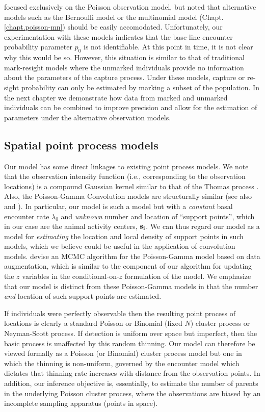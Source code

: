 \citet{chandler_royle:2012} focused exclusively on the Poisson
observation model, but noted that alternative models such as the
Bernoulli model or the multinomial model (Chapt. \ref{chapt.poisson-mn}) should
be easily accomodated. Unfortunately, our experimentation with these models
indicates that the base-line encounter probability parameter $p_0$ is
not identifiable. At this point in time, it is not clear why this
would be so. However, this situation is similar to that of traditional
mark-resight models where the unmarked individuals provide no
information about the parameters of the capture process. Under these
models, capture or re-sight probability can only be estimated by
marking a subset of the population. In the next chapter we demonstrate
how data from marked and unmarked individuals can be combined to
improve precision and allow for the estimation of parameters under the
alternative observation models.



\subsection{Spatial point process models}


Our model has some direct linkages to existing point process
models. We note that the observation intensity function (i.e.,
corresponding to the observation
locations) is a compound Gaussian kernel similar to
that of the Thomas process
\citep[pp. 61-62]{thomas:1949, moller_waagepetersen:2004}.
Also, the Poisson-Gamma Convolution models
\citep{wolpert_ickstadt:1998} are structurally similar (see also \cite{higdon:1998}
and \cite{best_etal:2000}).
 In particular, our model is such a model but
with a {\it constant} basal encounter rate $\lambda_{0}$
and {\it unknown} number and location of ``support points'', which in
our case are the animal activity centers, $\bf{s_i}$.
We can thus regard our model as a model for
{\it estimating} the location and local density of support points in
such models, which we believe could be useful in the application of
convolution models.  \citet{best_etal:2000} devise an MCMC algorithm for the
Poisson-Gamma model based on data augmentation, which is
similar to the component of our algorithm for
updating the $z$ variables in
the conditional-on-$z$ formulation of the model.  We emphasize that
our model is distinct from these Poisson-Gamma models
in that the number {\it and} location of such
support points are estimated.


If individuals were perfectly observable then the resulting point
process of locations is clearly a standard Poisson or Binomial (fixed
$N$) cluster process or Neyman-Scott process.
If detection is uniform over space but
imperfect, then the basic process is unaffected by this random thinning.
Our model can therefore be viewed formally as a Poisson (or Binomial)
cluster process model but one in which the thinning is
non-uniform, governed by the encounter model which dictates that
thinning rate increases with distance from the observation points. In
addition, our inference objective is, essentially, to estimate the
number of parents in the underlying Poisson cluster
process,
where the observations are biased by an incomplete sampling apparatus
(points in space).


